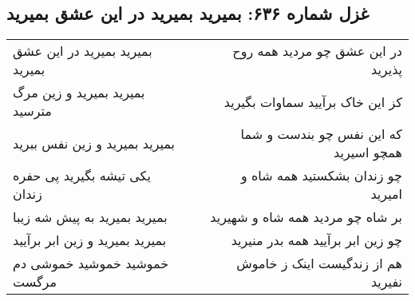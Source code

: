 \begin{center}
\section*{غزل شماره ۶۳۶: بمیرید بمیرید در این عشق بمیرید}
\label{sec:0636}
\begin{longtable}{l p{0.5cm} r}
بمیرید بمیرید در این عشق بمیرید
&&
در این عشق چو مردید همه روح پذیرید
\\
بمیرید بمیرید و زین مرگ مترسید
&&
کز این خاک برآیید سماوات بگیرید
\\
بمیرید بمیرید و زین نفس ببرید
&&
که این نفس چو بندست و شما همچو اسیرید
\\
یکی تیشه بگیرید پی حفره زندان
&&
چو زندان بشکستید همه شاه و امیرید
\\
بمیرید بمیرید به پیش شه زیبا
&&
بر شاه چو مردید همه شاه و شهیرید
\\
بمیرید بمیرید و زین ابر برآیید
&&
چو زین ابر برآیید همه بدر منیرید
\\
خموشید خموشید خموشی دم مرگست
&&
هم از زندگیست اینک ز خاموش نفیرید
\\
\end{longtable}
\end{center}

